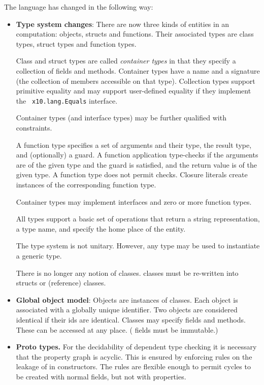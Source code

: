 The language has changed in the following way:
\begin{itemize}

\item {\bf Type system changes}: There are now three kinds of entities
  in an \Xten{} computation: objects, structs and functions. Their
  associated types are class types, struct types and function
  types. 

  Class and struct types are called {\em container types} in that they
  specify a collection of fields and methods. Container types have a
  name and a signature (the collection of members accessible on that
  type). Collection types support primitive equality \Xcd{==} and may
  support user-defined equality if they implement the {\tt
    x10.lang.Equals} interface. 

  Container types (and interface types) may be further qualified with
  constraints.

  A function type specifies a set of arguments and their type, the
  result type, and (optionally) a guard. A function application
  type-checks if the arguments are of the given type and the guard is
  satisfied, and the return value is of the given type.  A function
  type does not permit \Xcd{==} checks. Closure literals create
  instances of the corresponding function type.

  Container types may implement interfaces and zero or more function
  types.

  All types support a basic set of operations that return a string
  representation, a type name, and specify the home place of the entity.

  The type system is not unitary. However, any type may be used to
  instantiate a generic type. 

  There is no longer any notion of  classes. 
  classes must be re-written into structs or (reference) classes. 

\item {\bf Global object model}: Objects are instances of
  classes. Each object is associated with a globally unique
  identifier. Two objects are considered identical \Xcd{==} if their
  ids are identical. Classes may specify  fields and
  methods. These can be accessed at any place. ( fields
  must be immutable.)

\item{\bf Proto types.} For the decidability of dependent type
  checking it is necessary that the property graph is acyclic. This is
  ensured by enforcing rules on the leakage of  in
  constructors. The rules are flexible enough to permit cycles to be
  created with normal fields, but not with properties.


\end{itemize}
